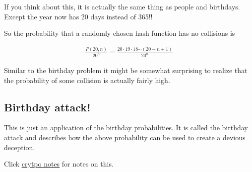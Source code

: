 \documentclass[12pt]{article}
\begin{document}
If you think about this, it is actually the same thing as people and birthdays. Except the year now has 20 days instead of 365!!

So the probability that a randomly chosen hash function has no collisions is

\begin{align*}
\frac{P(20, n)}{20^n} = \frac{20 \cdot 19 \cdot 18 \cdots (20 - n + 1)} {20^n}
\end{align*}

Similar to the birthday problem it might be somewhat surprising to realize that the probability of some collision is actually fairly high.

\subsection*{Birthday attack!}

This is just an application of the birthday probabilities. It is called the birthday attack and describes how the above probability can be used to create a devious deception.

Click \href{http://www.facweb.iitkgp.ernet.in/~sourav/lecture_note9.pdf}{ \underline{crytpo notes}} for notes on this.
\end{document}
